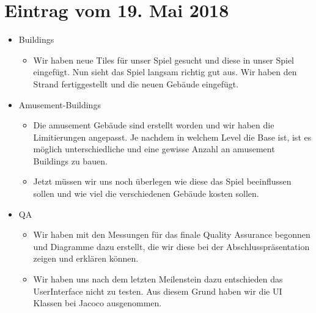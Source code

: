 \documentclass{scrartcl}
\begin{document}
\section*{Eintrag vom 19. Mai 2018}
\begin{itemize}
	\item Buildings
	\begin{itemize}
		\item Wir haben neue Tiles für unser Spiel gesucht und diese in unser Spiel eingefügt. Nun sieht das Spiel langsam richtig gut aus. Wir haben den Strand fertiggestellt und die neuen Gebäude eingefügt.
	\end{itemize}
	\item Amusement-Buildings
	\begin{itemize}
		\item Die amusement Gebäude sind erstellt worden und wir haben die Limitierungen angepasst. Je nachdem in welchem Level die Base ist, ist es möglich unterschiedliche und eine gewisse Anzahl an amusement Buildings zu bauen. 
		\item Jetzt müssen wir uns noch überlegen wie diese das Spiel beeinflussen sollen und wie viel die verschiedenen Gebäude kosten sollen. 
	\end{itemize}
	\item QA
	\begin{itemize}
		\item Wir haben mit den Messungen für das finale Quality Assurance begonnen und Diagramme dazu erstellt, die wir diese bei der Abschlusspräsentation zeigen und erklären können.
		\item Wir haben uns nach dem letzten Meilenstein dazu entschieden das UserInterface nicht zu testen. Aus diesem Grund haben wir die UI Klassen bei Jacoco ausgenommen.
	\end{itemize}
\end{itemize}
\end{document}
